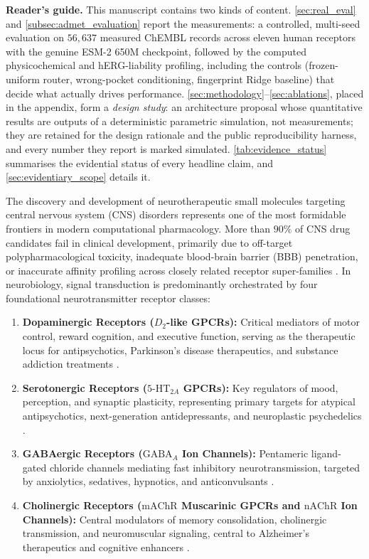 \documentclass{article}
\theoremstyle{definition}
\begin{document}
\textbf{Reader's guide.} This manuscript contains two kinds of content. \cref{sec:real_eval} and \cref{subsec:admet_evaluation} report the measurements: a controlled, multi-seed evaluation on $56{,}637$ measured ChEMBL records across eleven human receptors with the genuine ESM-2 650M checkpoint, followed by the computed physicochemical and hERG-liability profiling, including the controls (frozen-uniform router, wrong-pocket conditioning, fingerprint Ridge baseline) that decide what actually drives performance. \cref{sec:methodology}--\ref{sec:ablations}, placed in the appendix, form a \emph{design study}: an architecture proposal whose quantitative results are outputs of a deterministic parametric simulation, not measurements; they are retained for the design rationale and the public reproducibility harness, and every number they report is marked simulated. \cref{tab:evidence_status} summarises the evidential status of every headline claim, and \cref{sec:evidentiary_scope} details it.


The discovery and development of neurotherapeutic small molecules targeting central nervous system (CNS) disorders represents one of the most formidable frontiers in modern computational pharmacology. More than $90\%$ of CNS drug candidates fail in clinical development, primarily due to off-target polypharmacological toxicity, inadequate blood-brain barrier (BBB) penetration, or inaccurate affinity profiling across closely related receptor super-families \citep{mendez2019chembl,kooistra2021gpcrdb}. In neurobiology, signal transduction is predominantly orchestrated by four foundational neurotransmitter receptor classes:
\begin{enumerate}[leftmargin=1.8em,noitemsep]
    \item \textbf{Dopaminergic Receptors ($D_2$-like GPCRs):} Critical mediators of motor control, reward cognition, and executive function, serving as the therapeutic locus for antipsychotics, Parkinson's disease therapeutics, and substance addiction treatments \citep{wang2018structure}.
    \item \textbf{Serotonergic Receptors ($5\text{-HT}_{2A}$ GPCRs):} Key regulators of mood, perception, and synaptic plasticity, representing primary targets for atypical antipsychotics, next-generation antidepressants, and neuroplastic psychedelics \citep{kimura2019structures}.
    \item \textbf{GABAergic Receptors ($\text{GABA}_A$ Ion Channels):} Pentameric ligand-gated chloride channels mediating fast inhibitory neurotransmission, targeted by anxiolytics, sedatives, hypnotics, and anticonvulsants \citep{zhu2018structure}.
    \item \textbf{Cholinergic Receptors ($\text{mAChR}$ Muscarinic GPCRs and $\text{nAChR}$ Ion Channels):} Central modulators of memory consolidation, cholinergic transmission, and neuromuscular signaling, central to Alzheimer's therapeutics and cognitive enhancers \citep{haga2012structure}.
\end{enumerate}
\end{document}
